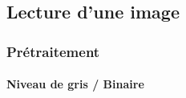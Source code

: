     \subsection{Lecture d'une image}

        \begin{frame}
            \frametitle{Prétraitement}
            \framesubtitle{Niveau de gris / Binaire}
            \begin{columns}
                \begin{column}{.3\linewidth}
                \end{column}
                \pause
                \begin{column}{.3\linewidth}

\end{column}
\end{columns}
\end{frame}
